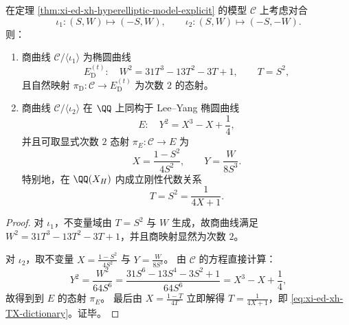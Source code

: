\begin{theorem}\label{thm:xi-ed-xh-bielliptic-leyang-edt}
在定理 \ref{thm:xi-ed-xh-hyperelliptic-model-explicit} 的模型 \(\mathcal C\) 上考虑对合
\[
\iota_1:(S,W)\longmapsto(-S,W),
\qquad
\iota_2:(S,W)\longmapsto(-S,-W).
\]
则：
\begin{enumerate}
  \item 商曲线 \(\mathcal C/\langle\iota_1\rangle\) 为椭圆曲线
  \[
  E_{\mathrm D}^{(t)}:\quad W^2=31T^3-13T^2-3T+1,\qquad T=S^2,
  \]
  且自然映射 \(\pi_{\mathrm D}:\mathcal C\to E_{\mathrm D}^{(t)}\) 为次数 \(2\) 的态射。
  \item 商曲线 \(\mathcal C/\langle\iota_2\rangle\) 在 \(\QQ\) 上同构于 Lee--Yang 椭圆曲线
  \[
  E:\quad Y^2=X^3-X+\frac14,
  \]
  并且可取显式次数 \(2\) 态射 \(\pi_E:\mathcal C\to E\) 为
  \begin{equation}\label{eq:xi-ed-xh-to-leyang-map}
  X=\frac{1-S^2}{4S^2},
  \qquad
  Y=\frac{W}{8S^3}.
  \end{equation}
  特别地，在 \(\QQ(X_H)\) 内成立刚性代数关系
  \begin{equation}\label{eq:xi-ed-xh-TX-dictionary}
  T=S^2=\frac{1}{4X+1}.
  \end{equation}
\end{enumerate}
\end{theorem}
\begin{proof}
对 \(\iota_1\)，不变量域由 \(T=S^2\) 与 \(W\) 生成，故商曲线满足 \(W^2=31T^3-13T^2-3T+1\)，并且商映射显然为次数 \(2\)。
\par
对 \(\iota_2\)，取不变量 \(X=\frac{1-S^2}{4S^2}\) 与 \(Y=\frac{W}{8S^3}\)。
由 \(\mathcal C\) 的方程直接计算：
\[
Y^2=\frac{W^2}{64S^6}
=\frac{31S^6-13S^4-3S^2+1}{64S^6}
=X^3-X+\frac14,
\]
故得到到 \(E\) 的态射 \(\pi_E\)。
最后由 \(X=\frac{1-T}{4T}\) 立即解得 \(T=\frac{1}{4X+1}\)，即 \eqref{eq:xi-ed-xh-TX-dictionary}。证毕。
\end{proof}


